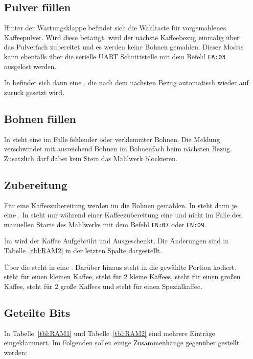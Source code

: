 \subsection{Pulver füllen}
Hinter der Wartungsklappe befindet sich die Wahltaste für vorgemahlenes Kaffeepulver.
Wird diese betätigt, wird der nächste Kaffeebezug einmalig über das Pulverfach zubereitet und es werden keine Bohnen gemahlen.
Dieser Modus kann ebenfalls über die serielle \ac{UART} Schnittstelle mit dem Befehl \texttt{FA:03} ausgelöst werden.

In  befindet sich dann eine , die nach dem nächsten Bezug automatisch wieder auf  zurück gesetzt wird.

\subsection{Bohnen füllen}
In  steht eine  im Falle fehlender oder verklemmter Bohnen.
Die Meldung verschwindet mit ausreichend Bohnen im Bohnenfach beim nächsten Bezug.
Zusätzlich darf dabei kein Stein das Mahlwerk blockieren.

\subsection{Zubereitung}\label{subsec:RAM:Zubereitung} %
Für eine Kaffeezubereitung werden im  die Bohnen gemahlen.
In  steht dann je eine .
In  steht nur während einer Kaffeezubereitung eine  und nicht im Falle des manuellen Starts des Mahlwerks mit dem Befehl \texttt{FN:07} oder \texttt{FN:09}.

Im  wird der Kaffee Aufgebrüht und Ausgeschenkt.
Die Änderungen sind in Tabelle~\ref{tbl:RAM2} in der letzten Spalte dargestellt.

Über die  steht in  eine .
Darüber hinaus steht in  die gewählte Portion kodiert.
 steht für einen kleinen Kaffee,  steht für 2 kleine Kaffees,  steht für einen großen Kaffee,  steht für 2 große Kaffees und  steht für einen Spezialkaffee.

\subsection{Geteilte Bits}
In Tabelle~\ref{tbl:RAM1} und Tabelle~\ref{tbl:RAM2} sind mehrere Einträge eingeklammert.
Im Folgenden sollen einige Zusammenhänge gegenüber gestellt werden:

